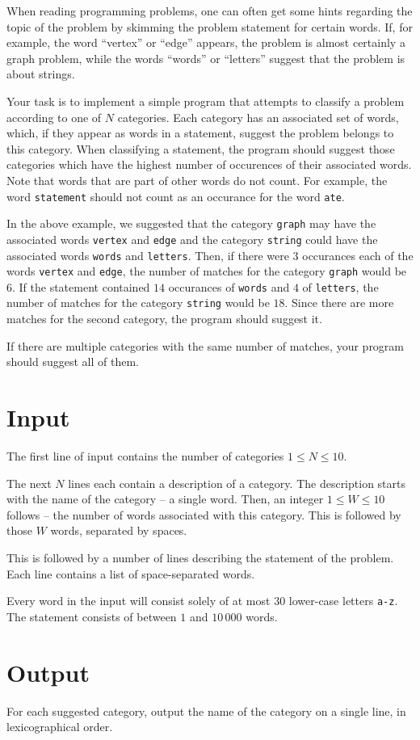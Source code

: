 When reading programming problems, one can often get some hints regarding the topic of the problem by skimming the problem statement for certain words.
If, for example, the word ``vertex'' or ``edge'' appears, the problem is almost certainly a graph problem, while the words ``words'' or ``letters'' suggest that the problem is about strings.

Your task is to implement a simple program that attempts to classify a problem according to one of $N$ categories.
Each category has an associated set of words, which, if they appear as words in a statement, suggest the problem belongs to this category.
When classifying a statement, the program should suggest those categories which have the highest number of occurences of their associated words.
Note that words that are part of other words do not count.
For example, the word \texttt{statement} should not count as an occurance for the word \texttt{ate}.

In the above example, we suggested that the category \texttt{graph} may have the associated words \texttt{vertex} and \texttt{edge} and the category \texttt{string} could have the associated words \texttt{words} and \texttt{letters}.
Then, if there were $3$ occurances each of the words \texttt{vertex} and \texttt{edge}, the number of matches for the category \texttt{graph} would be $6$.
If the statement contained $14$ occurances of \texttt{words} and $4$ of \texttt{letters}, the number of matches for the category \texttt{string} would be $18$.
Since there are more matches for the second category, the program should suggest it.

If there are multiple categories with the same number of matches, your program should suggest all of them.

\section*{Input}
The first line of input contains the number of categories $1 \le N \le 10$.

The next $N$ lines each contain a description of a category.
The description starts with the name of the category -- a single word.
Then, an integer $1 \le W \le 10$ follows -- the number of words associated with this category.
This is followed by those $W$ words, separated by spaces.

This is followed by a number of lines describing the statement of the problem.
Each line contains a list of space-separated words.

Every word in the input will consist solely of at most $30$ lower-case letters \texttt{a-z}.
The statement consists of between $1$ and $10\,000$ words.

\section*{Output}
For each suggested category, output the name of the category on a single line, in lexicographical order.
